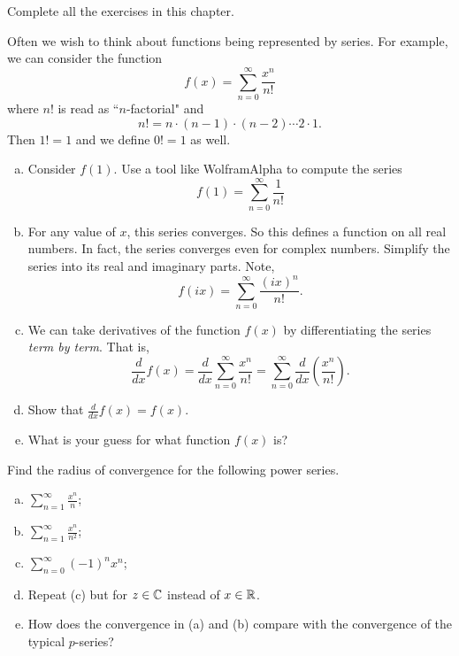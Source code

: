 \begin{problem}
Complete all the exercises in this chapter.
\end{problem}

\begin{problem}
Often we wish to think about functions being represented by series.  For example, we can consider the function
\[
f(x)=\sum_{n=0}^\infty \frac{x^n}{n!}
\]
where $n!$ is read as ``$n$-factorial" and
\[
n! = n\cdot (n-1)\cdot (n-2) \cdots 2 \cdot 1.
\]
Then $1!=1$ and we define $0!=1$ as well.
\begin{enumerate}[(a)]
    \item Consider $f(1)$.  Use a tool like WolframAlpha to compute the series
    \[
    f(1)=\sum_{n=0}^\infty \frac{1}{n!}
    \]
    \item For any value of $x$, this series converges. So this defines a function on all real numbers. In fact, the series converges even for complex numbers. Simplify the series into its real and imaginary parts. Note,
    \[
    f(ix) = \sum_{n=0}^\infty \frac{(ix)^n}{n!}.
    \]
    \item We can take derivatives of the function $f(x)$ by differentiating the series \emph{term by term}. That is,
    \[
    \frac{d}{dx} f(x) = \frac{d}{dx} \sum_{n=0}^\infty \frac{x^n}{n!} = \sum_{n=0}^\infty \frac{d}{dx} \left( \frac{ x^n}{n!}\right).
    \]
    \item Show that $\frac{d}{dx}f(x)=f(x)$.
    \item What is your guess for what function $f(x)$ is?
\end{enumerate}
\end{problem}

\begin{problem}
Find the radius of convergence for the following power series.
\begin{enumerate}[(a)]
    \item $\displaystyle{\sum_{n=1}^\infty \frac{x^n}{n}}$;
    \item $\displaystyle{\sum_{n=1}^\infty \frac{x^n}{n^2}}$;
    \item $\displaystyle{\sum_{n=0}^\infty (-1)^n x^n}$;
    \item Repeat (c) but for $z\in \mathbb{C}$ instead of $x\in \mathbb{R}$.
    \item How does the convergence in (a) and (b) compare with the convergence of the typical $p$-series?
\end{enumerate}
\end{problem}

